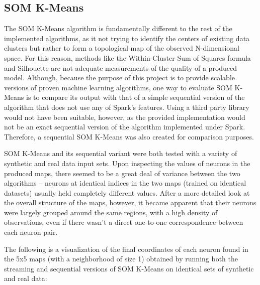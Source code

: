 \documentclass{l4proj}
\begin{document}
\subsection{SOM K-Means}

The SOM K-Means algorithm is fundamentally different to the rest of the implemented algorithms, as it not trying to identify the centers of existing data clusters but rather to form a topological map of the observed N-dimensional space. For this reason, methods like the Within-Cluster Sum of Squares formula and Silhouette are not adequate measurements of the quality of a produced model. Although, because the
purpose of this project is to provide scalable versions of proven machine learning algorithms, one way to evaluate SOM K-Means is to compare its output with that of a simple sequential version of the algorithm that does not use any of Spark's features. Using a third party library would not have been suitable, however, as the provided implementation would not be an exact sequential version of the algorithm implemented under Spark. Therefore, a sequential SOM K-Means was also created for comparison purposes.

SOM K-Means and its sequential variant were both tested with a variety of synthetic and real data input sets. Upon inspecting the values of neurons in the produced maps, there seemed to be a great deal of variance between the two algorithms -- neurons at identical indices in the two maps (trained on identical datasets) usually held completely different values. After a more detailed look at the overall structure of the maps, however, it became apparent that their neurons were largely grouped around the same regions, with a high density of observations, even if there wasn't a direct one-to-one correspondence between each neuron pair. 

The following is a visualization of the final coordinates of each neuron found in the 5x5 maps (with a neighborhood of size 1) obtained by running both the streaming and sequential versions of SOM K-Means on identical sets of synthetic and real data:
\end{document}
